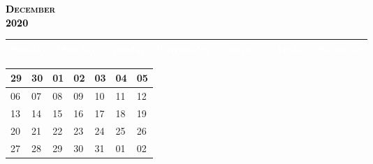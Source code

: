 \documentclass{article}
\newcommand{\daysize}{2.5cm}		%
\newcommand{\dw}{3.5cm}					%
\newcommand{\mkday}[1]{
  #1
  \vspace{\daysize}
}
\begin{document}
		\begin{center}
			\textsc{\LARGE \textbf{\textcolor{black}{
			December
			}}}\\ %
			\textsc{\large \textbf{\textcolor{black}{
			2020
			}}} %
		\end{center}

		\begin{center}
		\begin{tabular}{| p{\dw} | p{\dw} | p{\dw} | p{\dw} | p{\dw} | p{\dw} | p{\dw} |}
			\hline
			\cellcolor{bannercolor} \textcolor{white}{Sunday} &
			\cellcolor{bannercolor} \textcolor{white}{Monday} &
			\cellcolor{bannercolor} \textcolor{white}{Tuesday} &
			\cellcolor{bannercolor} \textcolor{white}{Wednesday} &
			\cellcolor{bannercolor} \textcolor{white}{Thursday} &
			\cellcolor{bannercolor} \textcolor{white}{Friday} &
			\cellcolor{bannercolor} \textcolor{white}{Saturday} \\
			\hline
		\end{tabular}

		\vspace{0.1cm}

		\begin{tabular}{| p{\dw} | p{\dw} | p{\dw} | p{\dw} | p{\dw} | p{\dw} | p{\dw} |}
\hline 
\cellcolor{weekendcolor}\mkday{
    29
} & 
\mkday{
    30
} &
\mkday{
    01
} &
\mkday{
    02
} &
\mkday{
    03
} &
\mkday{
    04
} &
\cellcolor{weekendcolor}\mkday{
    05
} 
\\
\hline 
\cellcolor{weekendcolor}\mkday{
    06
} & 
\mkday{
    07
} &
\mkday{
    08
} &
\mkday{
    09
} &
\mkday{
    10
} &
\mkday{
    11
} &
\cellcolor{weekendcolor}\mkday{
    12
} 
\\
\hline 
\cellcolor{weekendcolor}\mkday{
    13
} & 
\mkday{
    14
} &
\mkday{
    15
} &
\mkday{
    16
} &
\mkday{
    17
} &
\mkday{
    18
} &
\cellcolor{weekendcolor}\mkday{
    19
} 
\\
\hline 
\cellcolor{weekendcolor}\mkday{
    20
} & 
\mkday{
    21
} &
\mkday{
    22
} &
\mkday{
    23
} &
\mkday{
    24
} &
\mkday{
    25
} &
\cellcolor{weekendcolor}\mkday{
    26
} 
\\
\hline 
\cellcolor{weekendcolor}\mkday{
    27
} & 
\mkday{
    28
} &
\mkday{
    29
} &
\mkday{
    30
} &
\mkday{
    31
} &
\mkday{
    01
} &
\cellcolor{weekendcolor}\mkday{
    02
} 
\\
		\end{tabular}

		\end{center}
\end{document}
